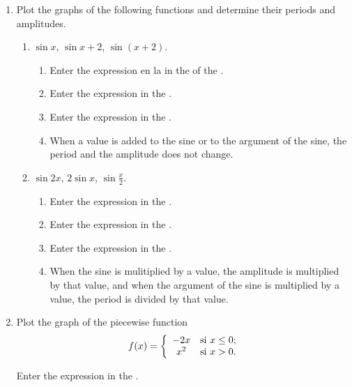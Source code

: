 \begin{enumerate}[leftmargin=*]
\item Plot the graphs of the following functions and determine their periods and amplitudes.
      \begin{enumerate}
      \item $\sin{x}$, $\sin{x}+2$, $\sin{(x+2)}$.
            \begin{indication}
            \begin{enumerate}
            \item Enter the expression  en la in the  of the .
            \item Enter the expression  in the .
            \item Enter the expression  in the .
            \item When a value is added to the sine or to the argument of the sine, the period and the amplitude does not change.
            \end{enumerate}
            \end{indication}
      \item $\sin{2x}$, $2\sin{x}$, $\sin\frac{x}{2}$.
            \begin{indication}
            \begin{enumerate}
            \item Enter the expression  in the .
            \item Enter the expression  in the .
            \item Enter the expression  in the .
            \item When the sine is mulitiplied by a value, the amplitude is multiplied by that value, and when the argument of the sine is multiplied by a value, the period is divided by that value.
            \end{enumerate}
            \end{indication}
      \end{enumerate}


\item Plot the graph of the piecewise function
      \[
      \ f(x)=\left\{
      \begin{array}{cl}
      -2x   & \hbox{si $x\leq0$;} \\
      x^{2} & \hbox{si $x>0$.}    \\
      \end{array}
      \right.
      \]

      \begin{indication}
      Enter the expression  in the .
      \end{indication}
\end{enumerate}


